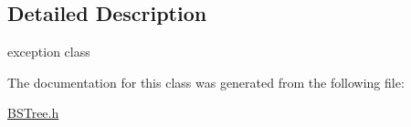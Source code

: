 \subsection{Detailed Description}
exception class 

The documentation for this class was generated from the following file\-:\begin{DoxyCompactItemize}
\item 
\hyperlink{BSTree_8h}{B\-S\-Tree.\-h}\end{DoxyCompactItemize}
